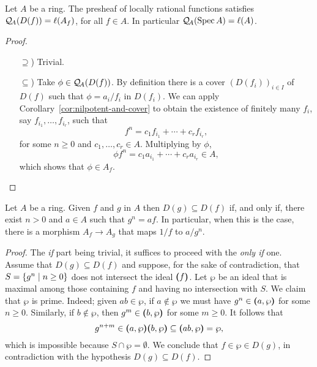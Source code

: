 \begin{prop}\label{prop:D(f)-is-Af}
    Let $A$ be a ring. The presheaf of locally rational functions satisfies\/ $\mathcal Q_{\!A}(D(f))=\ell(A_f)$, for all\/ $f\in A$. In particular $\mathcal Q_{\!A}(\operatorname{Spec} A)=\ell(A)$.
\end{prop}

\begin{proof}${}$
    \begin{enumerate}
        \item[$\supseteq$)] Trivial. 
        \item[$\subseteq$)] Take $\phi\in\mathcal Q_{\!A}(D(f))$. By definition there is a cover $(D(f_i))_{i\in I}$ of $D(f)$ such that $\phi=a_i/f_i$ in $D(f_i)$. We can apply Corollary~\ref{cor:nilpotent-and-cover} to obtain the existence of finitely many $f_i$, say $f_{i_1},\dots, f_{i_r}$, such that
        $$
            f^n = c_1f_{i_1} + \cdots + c_rf_{i_r},
        $$
        for some $n\ge0$ and $c_1,\dots,c_r\in A$. Multiplying by $\phi$,
        $$
            \phi f^n=c_1a_{i_1}+\cdots+c_ra_{i_r}\in A,
        $$
        which shows that $\phi\in A_f$.
    \end{enumerate}
\end{proof}

\begin{prop}\label{prop:Af->Ag}
    Let\/ $A$ be a ring. Given\/ $f$ and\/ $g$ in\/ $A$ then\/ $D(g)\subseteq D(f)$ if, and only if, there exist\/ $n>0$ and\/ $a\in A$ such that\/ $g^n=af$. In particular, when this is the case, there is a morphism\/ $A_f\to A_g$ that maps\/ $1/f$ to\/ $a/g^n$.
\end{prop}

\begin{proof}
    The \textit{if\/} part being trivial, it suffices to proceed with the \textit{only if\/} one. Assume that $D(g)\subseteq D(f)$ and suppose, for the sake of contradiction, that $S=\{g^n\mid n\ge0\}$ does not intersect the ideal $\textrm{\boldmath$($}f\textrm{\boldmath$)$}$. Let $\wp$ be an ideal that is maximal among those containing $f$ and having no intersection with $S$. We claim that $\wp$ is prime. Indeed; given $ab\in\wp$, if $a\notin\wp$ we must have $g^n\in\textrm{\boldmath$($}a,\wp\textrm{\boldmath$)$}$ for some $n\ge0$. Similarly, if $b\notin\wp$, then $g^m\in\textrm{\boldmath$($}b,\wp\textrm{\boldmath$)$}$ for some $m\ge0$. It follows that
    $$
        g^{n+m} \in \textrm{\boldmath$($}a,\wp\textrm{\boldmath$)$}\textrm{\boldmath$($}b,\wp\textrm{\boldmath$)$} \subseteq\textrm{\boldmath$($}ab,\wp\textrm{\boldmath$)$}=\wp,
    $$
    which is impossible because $S\cap\wp=\emptyset$. We conclude that $f\in\wp\in D(g)$, in contradiction with the hypothesis $D(g)\subseteq D(f)$.
\end{proof}


